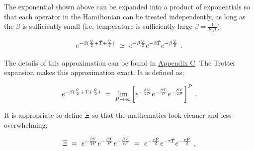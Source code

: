 \documentclass[11pt]{article}
\begin{document}
The exponential shown above can be expanded into a product of exponentials so that each operator in the Hamiltonian can be treated independently, as long as the \begin{math} \beta \end{math} is sufficiently small (i.e. temperature is sufficiently large \begin{math} \beta = \frac{1}{k_B T} \end{math}); 

\begin{equation} \label{wr-eq-5-1}
e^{-\beta ( \frac{\hat{V}}{2} + \hat{T} + \frac{\hat{V}}{2} )} \hspace{0.125cm} \simeq \hspace{0.125cm} e^{-\beta \frac{\hat{V}}{2}} e^{-\beta \hat{T}} e^{-\beta \frac{\hat{V}}{2}} \hspace{0.125cm} .
\end{equation}

The details of this approximation can be found in \hyperlink{wr-appendix-c}{Appendix C}. The Trotter expansion makes this approximation exact. It is defined as;

\begin{equation} \label{wr-eq-10-1}
e^{-\beta ( \frac{\hat{V}}{2} + \hat{T} + \frac{\hat{V}}{2} )} \hspace{0.125cm} = \hspace{0.125cm} \lim_{P \rightarrow \infty} \bigg[ e^{- \frac{\beta \hat{V}}{2P}} e^{- \frac{\beta \hat{T}}{P}} e^{- \frac{\beta \hat{V}}{2P}} \bigg]^P \hspace{0.125cm} .  
\end{equation}

It is appropriate to define \begin{math} \Xi \end{math} so that the mathematics look cleaner and less overwhelming;

\begin{equation} \label{wr-eq-11-1}
\Xi \hspace{0.125cm} = \hspace{0.125cm} e^{-\frac{\beta \hat{V}}{2 P}} e^{- \frac{\beta \hat{T}}{P}} e^{- \frac{\beta \hat{V}}{2 P}} \hspace{0.125cm} = \hspace{0.125cm}  e^{-\frac{\tau \hat{V}}{2}} e^{- \tau \hat{T}}  e^{-\frac{\tau \hat{V}}{2}} \hspace{0.125cm} ,
\end{equation}
\end{document}
